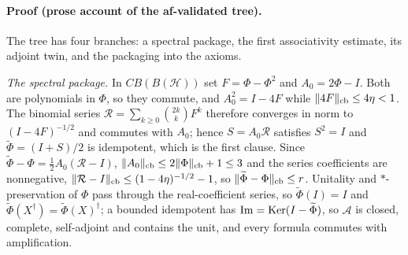 \paragraph{Proof (prose account of the af-validated tree).}
The tree has four branches: a spectral package, the first associativity estimate, its
adjoint twin, and the packaging into the axioms.

\emph{The spectral package.} In $CB(B(\mathcal H))$ set $F=\Phi-\Phi^{2}$ and
$A_{0}=2\Phi-I$. Both are polynomials in $\Phi$, so they commute, and $A_{0}^{2}=I-4F$
while $\lVert 4F\rVert_{\mathrm{cb}}\le4\eta<1$. The binomial series
$\mathcal R=\sum_{k\ge0}\binom{2k}{k}F^{k}$ therefore converges in norm to $(I-4F)^{-1/2}$
and commutes with $A_{0}$; hence $S=A_{0}\mathcal R$ satisfies $S^{2}=I$ and
$\widetilde\Phi=(I+S)/2$ is idempotent, which is the first clause. Since
$\widetilde\Phi-\Phi=\tfrac12A_{0}(\mathcal R-I)$,
$\lVert A_{0}\rVert_{\mathrm{cb}}\le2\lVert \Phi\rVert_{\mathrm{cb}}+1\le3$
and the series coefficients are nonnegative,
$\lVert \mathcal R-I\rVert_{\mathrm{cb}}\le(1-4\eta)^{-1/2}-1$, so
$\lVert \widetilde\Phi-\Phi\rVert_{\mathrm{cb}}\le r$. Unitality and $*$-preservation of $\Phi$
pass through the real-coefficient series, so $\widetilde\Phi(I)=I$ and
$\widetilde\Phi(X^{\dagger})=\widetilde\Phi(X)^{\dagger}$; a bounded idempotent has
$\operatorname{Im}=\operatorname{Ker}(I-\widetilde\Phi)$, so $\mathcal A$ is closed, complete, self-adjoint and
contains the unit, and every formula commutes with amplification.

